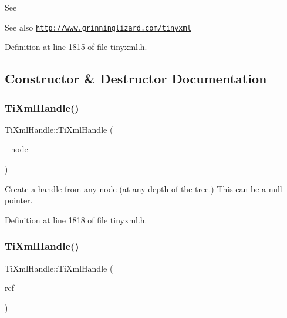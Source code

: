 See \begin{DoxySeeAlso}{See also}
\href{http://www.grinninglizard.com/tinyxml}{\tt http\+://www.\+grinninglizard.\+com/tinyxml} 
\end{DoxySeeAlso}


Definition at line 1815 of file tinyxml.\+h.



\subsection{Constructor \& Destructor Documentation}
\hypertarget{class_ti_xml_handle_aba18fd7bdefb942ecdea4bf4b8e29ec8}{}\label{class_ti_xml_handle_aba18fd7bdefb942ecdea4bf4b8e29ec8} 
\subsubsection{\texorpdfstring{Ti\+Xml\+Handle()}{TiXmlHandle()}\hspace{0.1cm}{\footnotesize\ttfamily [1/2]}}
{\footnotesize\ttfamily Ti\+Xml\+Handle\+::\+Ti\+Xml\+Handle (\begin{DoxyParamCaption}\item[{\hyperlink{class_ti_xml_node}{Ti\+Xml\+Node} $\ast$}]{\+\_\+node }\end{DoxyParamCaption})\hspace{0.3cm}{\ttfamily [inline]}}



Create a handle from any node (at any depth of the tree.) This can be a null pointer. 



Definition at line 1818 of file tinyxml.\+h.

\hypertarget{class_ti_xml_handle_a236d7855e1e56ccc7b980630c48c7fd7}{}\label{class_ti_xml_handle_a236d7855e1e56ccc7b980630c48c7fd7} 
\subsubsection{\texorpdfstring{Ti\+Xml\+Handle()}{TiXmlHandle()}\hspace{0.1cm}{\footnotesize\ttfamily [2/2]}}
{\footnotesize\ttfamily Ti\+Xml\+Handle\+::\+Ti\+Xml\+Handle (\begin{DoxyParamCaption}\item[{const \hyperlink{class_ti_xml_handle}{Ti\+Xml\+Handle} \&}]{ref }\end{DoxyParamCaption})\hspace{0.3cm}{\ttfamily [inline]}}



